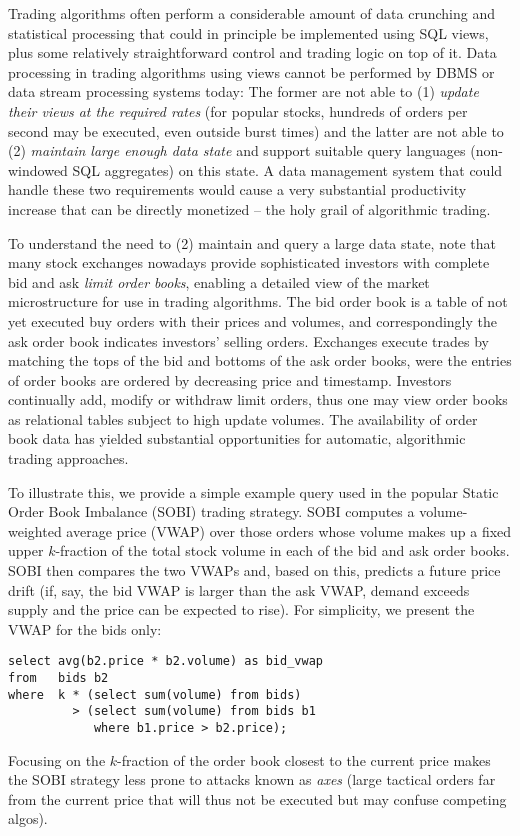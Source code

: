 Trading algorithms often perform a considerable amount of data crunching and statistical processing that could in principle be implemented using SQL views, plus some relatively straightforward control and trading logic on top of it. 
%
Data processing in trading algorithms using views
cannot be performed by DBMS or data stream processing systems today: The former are not able to (1) {\em update their views at the required rates}\/ (for popular stocks, hundreds of orders per second may be executed, even outside burst times)
and the latter are not able to (2) {\em maintain large enough data state}\/ and support suitable query languages (non-windowed SQL aggregates) on this state.
%
A data management system that could handle these two requirements would cause a very substantial productivity increase that can be directly monetized -- the holy grail of algorithmic trading.

To understand the need to (2) maintain and query a large data state, note that
many stock exchanges nowadays provide sophisticated investors with complete bid and ask {\em limit order books}\/, enabling a detailed view of the market microstructure for use in trading algorithms. The bid order book is a table of not yet executed buy orders with their prices and volumes, and correspondingly the ask order book indicates investors' selling
orders. Exchanges execute trades by matching the tops of the bid and bottoms of the ask order
books, were the entries of order books are ordered by decreasing price and timestamp. Investors continually add, modify or withdraw limit orders, thus one may view order books as relational tables subject to high update volumes.
The availability of order book data has yielded substantial opportunities for automatic, algorithmic trading approaches. 

To illustrate this, we provide a simple example query used in the popular Static
Order Book Imbalance (SOBI) trading strategy. SOBI computes a volume-weighted
average price (VWAP) over those orders whose volume makes up a fixed upper
$k$-fraction of the total stock volume in each of the bid and ask order books. SOBI
then compares the two VWAPs and, based on this, predicts a future price drift (if, say, the bid VWAP is larger than the ask VWAP, demand exceeds supply and the price can be expected to rise). For simplicity, we present the VWAP for the bids only:
\begin{verbatim}
select avg(b2.price * b2.volume) as bid_vwap
from   bids b2
where  k * (select sum(volume) from bids)
         > (select sum(volume) from bids b1
            where b1.price > b2.price);
\end{verbatim}
Focusing on the $k$-fraction of the order book closest to the current price makes the SOBI strategy less prone to attacks known as {\em axes}\/ (large tactical orders far from the current price that will thus not be executed but may confuse competing algos).

